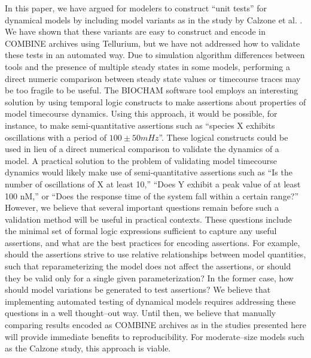 \documentclass[10pt,letterpaper]{article}
\begin{document}
In this paper, we have argued for modelers to construct ``unit tests'' for dynamical models by including model variants as in the study by Calzone et al. \cite{calzone2007dynamical}. We have shown that these variants are easy to construct and encode in COMBINE archives using Tellurium, but we have not addressed how to validate these tests in an automated way. Due to simulation algorithm differences between tools and the presence of multiple steady states in some models, performing a direct numeric comparison between steady state values or timecourse traces may be too fragile to be useful. The BIOCHAM software tool \cite{calzone2006biocham} employs an interesting solution by using temporal logic constructs to make assertions about properties of model timecourse dynamics. Using this approach, it would be possible, for instance, to make semi-quantitative assertions such as ``species X exhibits oscillations with a period of $100 \pm 50 mHz$''. These logical constructs could be used in lieu of a direct numerical comparison to validate the dynamics of a model. A practical solution to the problem of validating model timecourse dynamics would likely make use of semi-quantitative assertions such as ``Is the number of oscillations of X at least 10,'' ``Does Y exhibit a peak value of at least 100 nM,'' or ``Does the response time of the system fall within a certain range?'' However, we believe that several important questions remain before such a validation method will be useful in practical contexts. These questions include the minimal set of formal logic expressions sufficient to capture any useful assertions, and what are the best practices for encoding assertions. For example, should the assertions strive to use relative relationships between model quantities, such that reparameterizing the model does not affect the assertions, or should they be valid only for a single given parameterization? In the former case, how should model variations be generated to test assertions? We believe that implementing automated testing of dynamical models requires addressing these questions in a well thought--out way. Until then, we believe that manually comparing results encoded as COMBINE archives as in the studies presented here will provide immediate benefits to reproducibility. For moderate--size models such as the Calzone study, this approach is viable.

\end{document}
